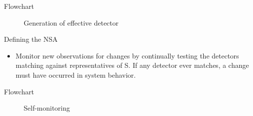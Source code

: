\begin{frame}{Flowchart}
  \begin{figure}[hb]
  \centering
  \caption{Generation of effective detector}
  \end{figure}
\end{frame}

\begin{frame}{Defining the NSA}
  \begin{itemize}
  \item {
    Monitor new observations for changes by continually testing the detectors matching against representatives of S.  If any detector ever matches, a change must have occurred in system behavior.
  }
  \end{itemize}
\end{frame}

\begin{frame}{Flowchart}
  \begin{figure}[hb]
  \centering
  \caption{Self-monitoring}
  \end{figure}
\end{frame}
